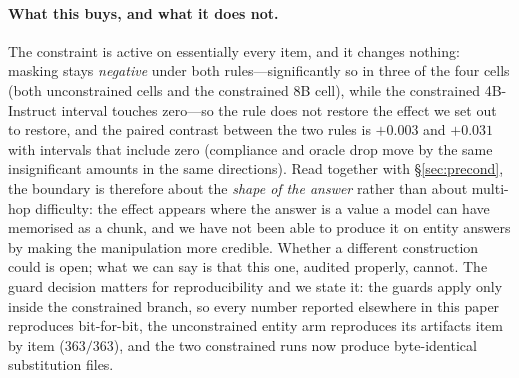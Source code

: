 \documentclass[11pt]{article}
\begin{document}
\paragraph{What this buys, and what it does not.}
The constraint is active on essentially every item, and it changes nothing: masking stays
\emph{negative} under both rules---significantly so in three of the four cells (both
unconstrained cells and the constrained 8B cell), while the constrained 4B-Instruct interval
touches zero---so the rule does not restore the effect we set out to restore, and the paired
contrast between the two rules is $+0.003$ and $+0.031$ with intervals that include zero
(compliance and oracle drop move by the same insignificant amounts in the same directions).
Read together with \S\ref{sec:precond}, the boundary is therefore about the
\emph{shape of the answer} rather than about multi-hop difficulty: the effect appears where
the answer is a value a model can have memorised as a chunk, and we have not been able to
produce it on entity answers by making the manipulation more credible. Whether a different
construction could is open; what we can say is that this one, audited properly, cannot.
The guard decision matters for reproducibility and we state it: the guards apply only inside
the constrained branch, so every number reported elsewhere in this paper reproduces
bit-for-bit, the unconstrained entity arm reproduces its artifacts item by item ($363/363$),
and the two constrained runs now produce byte-identical substitution files.
\end{document}
